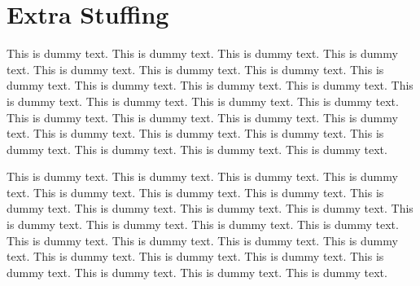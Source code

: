 \documentclass{book}
\begin{document}
\chapter{Extra Stuffing}\label{Stuffing}
This is dummy text. This is dummy text. This is dummy text. This is dummy text. This is dummy text. This is dummy text. This is dummy text. This is dummy text. This is dummy text. This is dummy text. This is dummy text. This is dummy text. This is dummy text. This is dummy text. This is dummy text. This is dummy text. This is dummy text. This is dummy text. This is dummy text. This is dummy text. This is dummy text. This is dummy text. This is dummy text. This is dummy text. This is dummy text. This is dummy text. 

This is dummy text. This is dummy text. This is dummy text. This is dummy text. This is dummy text. This is dummy text. This is dummy text. This is dummy text. This is dummy text. This is dummy text. This is dummy text. This is dummy text. This is dummy text. This is dummy text. This is dummy text. This is dummy text. This is dummy text. This is dummy text. This is dummy text. This is dummy text. This is dummy text. This is dummy text. This is dummy text. This is dummy text. This is dummy text. This is dummy text. 

\backmatter

\nocite{*}

\end{document}
